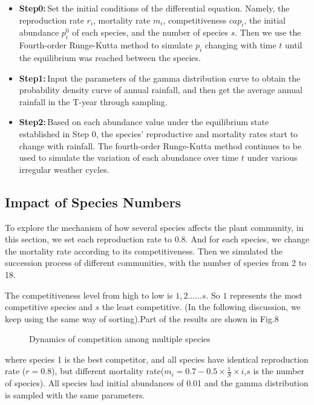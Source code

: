 \documentclass{mcmthesis}
\begin{document}
\begin{itemize}
	\item \textbf{Step0:}\,Set the initial conditions of the differential equation. Namely, the reproduction rate $r_i$, mortality rate $m_i$, competitiveness $cap_i$, the initial abundance $p_i^0$ of each species, and the number of species $s$. Then we use the Fourth-order Runge-Kutta method to simulate $p_i$ changing with time $t$ until the equilibrium was reached between the species. 
	
	\item \textbf{Step1:}\,Input the parameters of the gamma distribution curve to obtain the probability density curve of annual rainfall, and then get the average annual rainfall in the T-year through sampling. 

	\item \textbf{Step2:}\,Based on each abundance value under the equilibrium state established in Step 0, the species' reproductive and mortality rates start to change with rainfall. The fourth-order Runge-Kutta method continues to be used to simulate the variation of each abundance over time $t$ under various irregular weather cycles.
\end{itemize}

\subsection{Impact of Species Numbers}
To explore the mechanism of how several species affects the plant community, in this section, we set each reproduction rate to 0.8. And for each species, we change the mortality rate according to its competitiveness. Then we simulated the succession process of different communities, with the number of species from 2 to 18.

The competitiveness level from high to low is $1,2...... s$. So $1$ represents the most competitive species and $s$ the least competitive. (In the following discussion, we keep using the same way of sorting).Part of the results are shown in Fig.8

\begin{figure}[h]
	\centering
	\caption{Dynamics of competition among multiple species} 
\end{figure}
\noindent where species 1 is the best competitor, and all species have identical reproduction rate ($r=0.8$), but different mortality rate($m_i=0.7-0.5\times {\frac{1}{S}}\times i$,$s$ is the number of species). All species had initial abundances of 0.01 and the gamma distribution is sampled with the same parameters.
\end{document}
